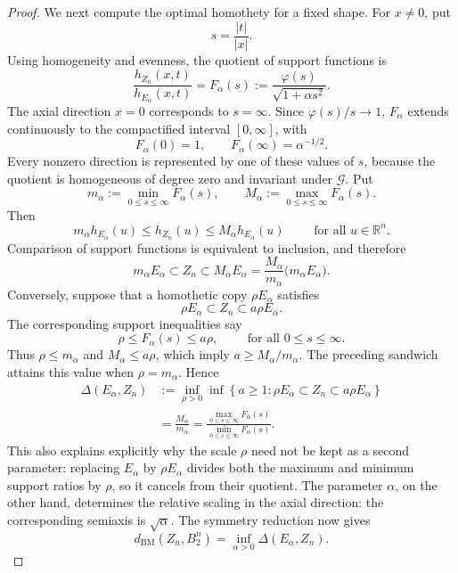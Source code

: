 \documentclass[11pt]{article}
\theoremstyle{definition}
\theoremstyle{remark}
\newcommand{\R}{\mathbb R}
\newcommand{\abs}[1]{\left|#1\right|}
\newcommand{\BM}{\mathrm{BM}}
\begin{document}
\begin{proof}
We next compute the optimal homothety for a fixed shape.  For
$x\neq0$, put
\[
 s=\frac{\abs{t}}{\abs{x}}.
\]
Using homogeneity and evenness, the quotient of support functions is
\begin{equation}\label{eq:Falpha}
 \frac{h_{Z_n}(x,t)}{h_{E_\alpha}(x,t)}
 =F_\alpha(s)
 :=\frac{\varphi(s)}{\sqrt{1+\alpha s^2}}.
\end{equation}
The axial direction $x=0$ corresponds to $s=\infty$.  Since
$\varphi(s)/s\to1$, $F_\alpha$ extends continuously to the
compactified interval $[0,\infty]$, with
\[
 F_\alpha(0)=1,
 \qquad
 F_\alpha(\infty)=\alpha^{-1/2}.
\]
Every nonzero direction is represented by one of these values of
$s$, because the quotient is homogeneous of degree zero and invariant
under $\mathcal G$.  Put
\[
 m_\alpha:=\min_{0\leq s\leq\infty}F_\alpha(s),
 \qquad
 M_\alpha:=\max_{0\leq s\leq\infty}F_\alpha(s).
\]
Then
\[
 m_\alpha h_{E_\alpha}(u)
 \leq h_{Z_n}(u)
 \leq M_\alpha h_{E_\alpha}(u)
 \qquad\mbox{ for all } u\in\R^n.
\]
Comparison of support functions is equivalent to inclusion, and
therefore
\[
 m_\alpha E_\alpha
 \subset Z_n
 \subset M_\alpha E_\alpha
 =\frac{M_\alpha}{m_\alpha}
   \bigl(m_\alpha E_\alpha\bigr).
\]
Conversely, suppose that a homothetic copy $\rho E_\alpha$ satisfies
\[
 \rho E_\alpha\subset Z_n\subset a\rho E_\alpha.
\]
The corresponding support inequalities say
\[
 \rho\leq F_\alpha(s)\leq a\rho, \qquad
\mbox{ for all } 0\leq s\leq\infty.
\]
Thus $\rho\leq m_\alpha$ and $M_\alpha\leq a\rho$, which imply
$a\geq M_\alpha/m_\alpha$.  The preceding sandwich attains this value
when $\rho=m_\alpha$.  Hence
\begin{equation}\label{eq:Delta-alpha}
 \begin{split}
 \Delta(E_\alpha,Z_n)
 &:=%
 \inf_{\rho>0}\inf\left\{
 a\geq1:\rho E_\alpha\subset Z_n\subset a\rho E_\alpha
 \right\}\\
 &=\frac{M_\alpha}{m_\alpha}
 =\frac{\displaystyle
        \max_{0\leq s\leq\infty}F_\alpha(s)}
       {\displaystyle
        \min_{0\leq s\leq\infty}F_\alpha(s)}.
 \end{split}
\end{equation}
This also explains explicitly why the scale $\rho$ need not be kept
as a second parameter: replacing $E_\alpha$ by $\rho E_\alpha$
divides both the maximum and minimum support ratios by $\rho$, so it
cancels from their quotient.  The parameter $\alpha$, on the other hand, determines the relative
scaling in the axial direction: the corresponding semiaxis is
$\sqrt{\alpha}$.  The symmetry
reduction now gives
\[
 d_{\BM}(Z_n,B_2^n)
 =\inf_{\alpha>0}\Delta(E_\alpha,Z_n).
\]


\end{proof}
\end{document}
